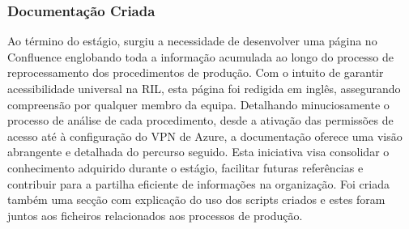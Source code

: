 
        \subsubsection{Documentação Criada}\label{secsec:documentação}
            
            Ao término do estágio, surgiu a necessidade de desenvolver uma página no Confluence englobando toda a informação acumulada ao longo do processo de reprocessamento dos procedimentos de produção. Com o intuito de garantir acessibilidade universal na RIL, esta página foi redigida em inglês, assegurando compreensão por qualquer membro da equipa. Detalhando minuciosamente o processo de análise de cada procedimento, desde a ativação das permissões de acesso até à configuração do VPN de Azure, a documentação oferece uma visão abrangente e detalhada do percurso seguido. Esta iniciativa visa consolidar o conhecimento adquirido durante o estágio, facilitar futuras referências e contribuir para a partilha eficiente de informações na organização. Foi criada também uma secção com explicação do uso dos scripts criados e estes foram juntos aos ficheiros relacionados aos processos de produção.

        
        



